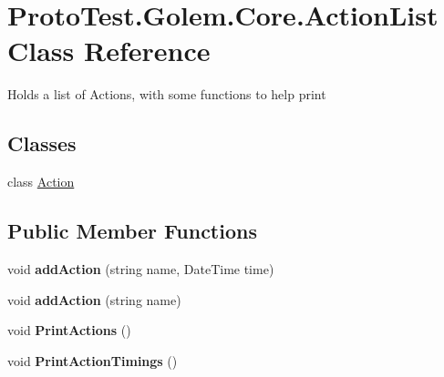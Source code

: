 \hypertarget{class_proto_test_1_1_golem_1_1_core_1_1_action_list}{\section{Proto\-Test.\-Golem.\-Core.\-Action\-List Class Reference}
\label{class_proto_test_1_1_golem_1_1_core_1_1_action_list}
}


Holds a list of Actions, with some functions to help print  


\subsection*{Classes}
\begin{DoxyCompactItemize}
\item 
class \hyperlink{class_proto_test_1_1_golem_1_1_core_1_1_action_list_1_1_action}{Action}
\end{DoxyCompactItemize}
\subsection*{Public Member Functions}
\begin{DoxyCompactItemize}
\item 
\hypertarget{class_proto_test_1_1_golem_1_1_core_1_1_action_list_a9a10f9c2dae856ba14ccec046b0ab028}{void {\bfseries add\-Action} (string name, Date\-Time time)}\label{class_proto_test_1_1_golem_1_1_core_1_1_action_list_a9a10f9c2dae856ba14ccec046b0ab028}

\item 
\hypertarget{class_proto_test_1_1_golem_1_1_core_1_1_action_list_a9d6ca3de4af7273d5677d44592365b82}{void {\bfseries add\-Action} (string name)}\label{class_proto_test_1_1_golem_1_1_core_1_1_action_list_a9d6ca3de4af7273d5677d44592365b82}

\item 
\hypertarget{class_proto_test_1_1_golem_1_1_core_1_1_action_list_a7eed4d083d705b0f295c2ba71b2e70b9}{void {\bfseries Print\-Actions} ()}\label{class_proto_test_1_1_golem_1_1_core_1_1_action_list_a7eed4d083d705b0f295c2ba71b2e70b9}

\item 
\hypertarget{class_proto_test_1_1_golem_1_1_core_1_1_action_list_a77b2737f5ee4958b74c9dcadd5876840}{void {\bfseries Print\-Action\-Timings} ()}\label{class_proto_test_1_1_golem_1_1_core_1_1_action_list_a77b2737f5ee4958b74c9dcadd5876840}

\end{DoxyCompactItemize}
